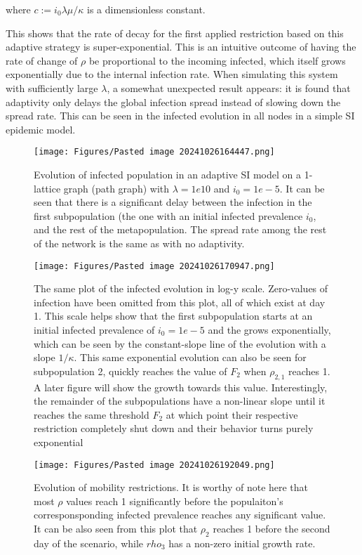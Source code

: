 \documentclass{article}
\begin{document}
where $c := i_{0} \lambda \mu / \kappa$ is a dimensionless constant.

This shows that the rate of decay for the first applied restriction based on this adaptive strategy is super-exponential. This is an intuitive outcome of having the rate of change of $\rho$ be proportional to the incoming infected, which itself grows exponentially due to the internal infection rate. When simulating this system with sufficiently large $\lambda$, a somewhat unexpected result appears: it is found that adaptivity only delays the global infection spread instead of slowing down the spread rate. This can be seen in the infected evolution in all nodes in a simple SI epidemic model.

\begin{figure}[h!]
    \centering
    \texttt{[image: Figures/Pasted image 20241026164447.png]}
    \caption{\small Evolution of infected population in an adaptive SI model on a 1-lattice graph 
    (path graph) with $\lambda = 1e10$ and $i_0 = 1e-5$. It can be seen that there is a significant 
    delay between the infection in the first subpopulation (the one with an initial infected prevalence $i_0$, and the rest of the metapopulation. The spread rate among the rest of the network is the same as with no adaptivity.}
\end{figure}

\begin{figure}[h!]
    \centering
    \texttt{[image: Figures/Pasted image 20241026170947.png]}
    \caption{\small The same plot of the infected evolution in log-y scale. 
    Zero-values of infection have been omitted from this plot, all of which exist at day 1. 
    This scale helps show that the first subpopulation starts at an initial infected prevalence of 
    $i_0=1e-5$ and the grows exponentially, which can be seen by the constant-slope line of the evolution with a slope $1/\kappa$. This same exponential evolution can also be seen for subpopulation 2, quickly reaches the value of $F_2$ when $\rho_{2,1}$ reaches 1. A later figure will show the growth towards this value. Interestingly, the remainder of the subpopulations have a non-linear slope until it reaches the same threshold $F_2$ at which point their respective restriction completely shut down and their behavior turns purely exponential}
\end{figure}

\begin{figure}[h!]
    \centering
    \texttt{[image: Figures/Pasted image 20241026192049.png]}
    \caption{\small Evolution of mobility restrictions. It is worthy of note here that most $\rho$ values reach 1 significantly before the populaiton's corresponsponding infected prevalence reaches any significant value. It can be also seen from this plot that $\rho_2$ reaches 1 before the second day of the scenario, while $rho_3$ has a non-zero initial growth rate.}
\end{figure}
\end{document}
